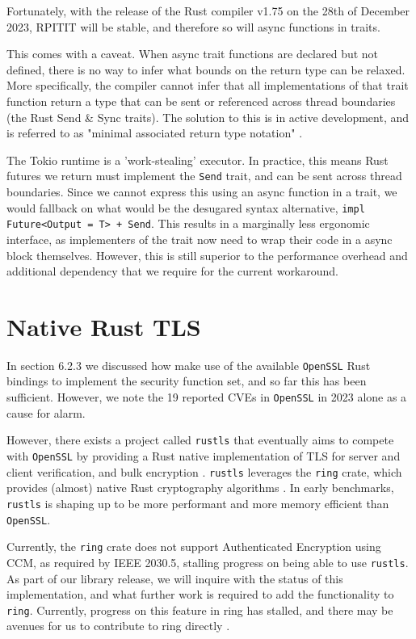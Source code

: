 Fortunately, with the release of the Rust compiler v1.75 on the 28th of December 2023, RPITIT will be stable, and therefore so will async functions in traits. \cite{rust175}

This comes with a caveat. When async trait functions are declared but not defined, there is no way to infer what bounds on the return type can be relaxed. More specifically, the compiler cannot infer that all implementations of that trait function return a type that can be sent or referenced across thread boundaries (the Rust Send \& Sync traits). The solution to this is in active development, and is referred to as "minimal associated return type notation" \cite{sendboundproblem}.

The Tokio runtime is a 'work-stealing' executor. In practice, this means Rust futures we return must implement the \texttt{Send} trait, and can be sent across thread boundaries. Since we cannot express this using an async function in a trait, we would fallback on what would be the desugared syntax alternative, \texttt{impl Future<Output = T> + Send}. This results in a marginally less ergonomic interface, as implementers of the trait now need to wrap their code in a async block themselves. However, this is still superior to the performance overhead and additional dependency that we require for the current workaround.

\section{Native Rust TLS}
In section 6.2.3 we discussed how make use of the available \texttt{OpenSSL} Rust bindings to implement the security function set, and so far this has been sufficient. However, we note the 19 reported CVEs in \texttt{OpenSSL} in 2023 alone as a cause for alarm. \cite{OpensslCVE}

However, there exists a project called \texttt{rustls} that eventually aims to compete with \texttt{OpenSSL} by providing a Rust native implementation of TLS for server and client verification, and bulk encryption \cite{rustls}. \texttt{rustls} leverages the \texttt{ring} crate, which provides (almost) native Rust cryptography algorithms \cite{ring}. 
In early benchmarks, \texttt{rustls} is shaping up to be more performant and more memory efficient than \texttt{OpenSSL}.

Currently, the \texttt{ring} crate does not support Authenticated Encryption using CCM, as required by IEEE 2030.5, stalling progress on being able to use \texttt{rustls}. As part of our library release, we will inquire with the status of this implementation, and what further work is required to add the functionality to \texttt{ring}. Currently, progress on this feature in ring has stalled, and there may be avenues for us to contribute to ring directly \cite{ringccmpr} \cite{ringccmissue}.


